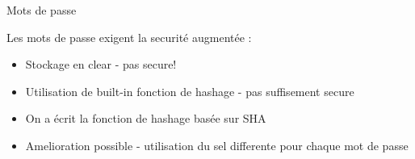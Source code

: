 \begin{frame}{Mots de passe}

  Les mots de passe exigent la securité augmentée : 
  \begin{itemize}
  \item Stockage en clear - pas secure!
  \item Utilisation de built-in fonction de hashage - pas suffisement secure
  \item On a écrit la fonction de hashage basée sur SHA
  \item Amelioration possible - utilisation du sel differente pour chaque mot de passe
  \end{itemize}
\end{frame}